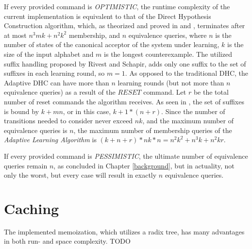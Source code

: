 If every provided command is \textit{OPTIMISTIC}, the runtime complexity of the current implementation is equivalent to that of the Direct Hypothesis Construction algorithm, which, as theorized and proved in \cite{Steffen2011} and \cite{10.1007/978-3-642-34781-8_19}, terminates after at most $n^3mk+n^2k^2$ membership, and $n$ equivalence queries, where $n$ is the number of states of the canonical acceptor of the system under learning, $k$ is the size of the input alphabet and $m$ is the longest counterexample. The utilized suffix handling proposed by Rivest and Schapir\cite{rivest1993inference}, adds only one suffix to the set of suffixes in each learning round, so $m=1$\cite{Steffen2011}. As opposed to the traditional DHC, the Adaptive DHC can have more than $n$ learning rounds (but not more than $n$ equivalence queries) as a result of the $RESET$ command. Let $r$ be the total number of reset commands the algorithm receives. As seen in \cite{Steffen2011}, the set of suffixes is bound by $k+mn$, or in this case, $k+1*(n+r)$. Since the number of transitions needed to consider never exceed $nk$\cite{Steffen2011}, and the maximum number of equivalence queries is $n$, the maximum number of membership queries of the \textit{Adaptive Learning Algorithm} is $(k+n+r)*nk*n = $\textbf{$ n^2k^2+n^3k+n^2kr$}.

If every provided command is \textit{PESSIMISTIC}, the ultimate number of equivalence queries remain $n$, as concluded in Chapter \ref{background}, but in actuality, not only the worst, but every case will result in exactly $n$ equivalence queries.
\section{Caching} \label{subs_evalcaching}

The implemented memoization, which utilizes a radix tree, has many advantages in both run- and space complexity. TODO